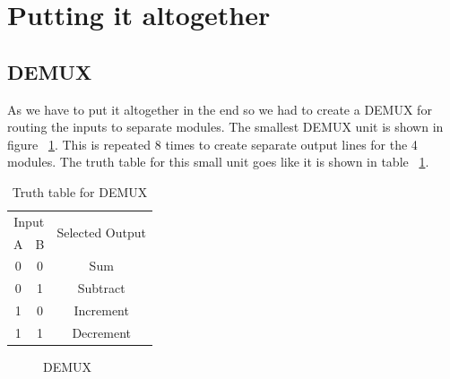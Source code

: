 \documentclass[a4paper, 12pt, twoside]{scrreprt}
\begin{document}
\section{Putting it altogether}
\subsection{DEMUX}
As we have to put it altogether in the end so we had to create a DEMUX for routing the inputs to separate modules. The smallest DEMUX unit is shown in figure ~\ref{demux}. This is repeated 8 times to create separate output lines for the 4 modules. The truth table for this small unit goes like it is shown in table ~\ref{demuxtable}.
\begin{table}[h]
\centering
\caption{Truth table for DEMUX}
\label{demuxtable}
\begin{tabular}{|c|c|c|}
\hline
\multicolumn{2}{|c|}{Input} & \multirow{2}{*}{Selected Output} \\ \cline{1-2}
A            & B            &                                  \\ \hline
0            & 0            & Sum                              \\ \hline
0            & 1            & Subtract                         \\ \hline
1            & 0            & Increment                        \\ \hline
1            & 1            & Decrement                        \\ \hline
\end{tabular}
\end{table}

\begin{center}
\begin{figure}[h]
\begin{center}
\end{center} 
\caption{DEMUX \label{demux}}
\end{figure}
\end{center}
\end{document}
